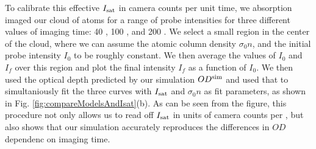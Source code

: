 To calibrate this effective $I_{\rm{sat}}$ in camera counts per unit time, we absorption imaged our cloud of \K{} atoms for a range of probe intensities for three different values of imaging time: 40 \us{}, 100 \us{}, and 200 \us{}. We select a small region in the center of the cloud, where we can assume the atomic column density $\sigma_0 n$, and the initial probe intensity $I_0$ to be roughly constant. We then average the values of $I_0$ and $I_f$ over this region and plot the final intensity $I_f$ as a function of $I_0$. We then used the optical depth predicted by our simulation $OD^{\rm{sim}}$ and used that to simultaniously fit the three curves with $I_{\rm{sat}}$ and $\sigma_0 n$ as fit parameters, as shown in Fig. \ref{fig:compareModelsAndIsat}(b). As can be seen from the figure, this procedure not only allows us to read off $I_{\rm{sat}}$ in units of camera counts per \us{}, but also shows that our simulation accurately reproduces the differences in $OD$ dependenc on imaging time.  
%
%
%
%


